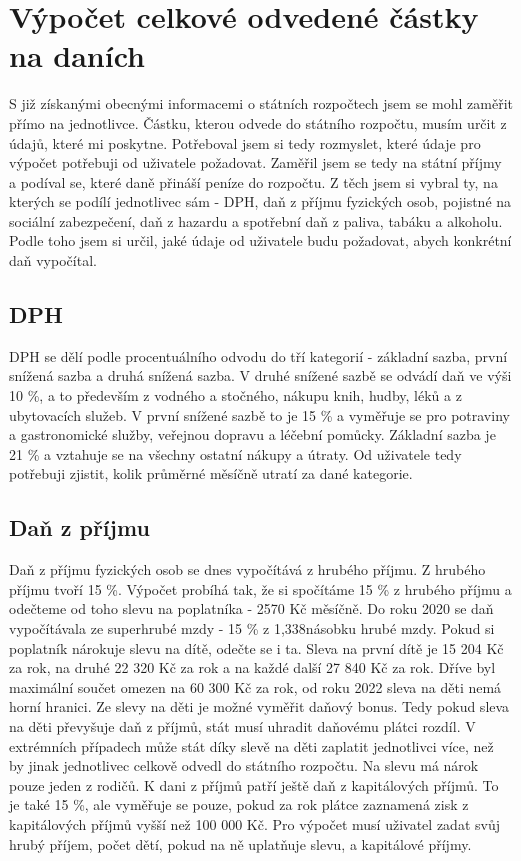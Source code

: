 \documentclass[11pt,a4paper,twoside,openright]{report}
\begin{document}
\section{Výpočet celkové odvedené částky na daních}

S již získanými obecnými informacemi o státních rozpočtech jsem se mohl zaměřit přímo na jednotlivce.
Částku, kterou odvede do státního rozpočtu, musím určit z údajů, které mi poskytne. Potřeboval jsem si tedy
 rozmyslet, které údaje pro výpočet potřebuji od uživatele požadovat. Zaměřil jsem se tedy na státní příjmy
a podíval se, které daně přináší peníze do rozpočtu. Z těch jsem si vybral ty, na kterých se podílí jednotlivec
sám - DPH, daň z příjmu fyzických osob, pojistné na sociální zabezpečení, daň z hazardu a spotřební daň z
paliva, tabáku a alkoholu. Podle toho jsem si určil, jaké údaje od uživatele budu požadovat, abych konkrétní
daň vypočítal.

\subsection{DPH}

DPH se dělí podle procentuálního odvodu do tří kategorií - základní sazba, první snížená
sazba a druhá snížená sazba. V druhé snížené sazbě se odvádí daň ve výši 10 \%, a to především
z vodného a stočného, nákupu knih, hudby, léků a z ubytovacích služeb. V první snížené sazbě to
je 15 \% a vyměřuje se pro potraviny a gastronomické služby, veřejnou dopravu a léčební pomůcky.
Základní sazba je 21 \% a vztahuje se na všechny ostatní nákupy a útraty. Od uživatele
tedy potřebuji zjistit, kolik průměrné měsíčně utratí za dané kategorie.

\subsection{Daň z příjmu}

Daň z příjmu fyzických osob se dnes vypočítává z hrubého příjmu. Z hrubého příjmu tvoří
15 \%. Výpočet probíhá tak, že si spočítáme 15 \% z hrubého příjmu a odečteme od toho
slevu na poplatníka - 2570 Kč měsíčně. Do roku 2020 se daň vypočítávala ze superhrubé mzdy
- 15 \% z 1,338násobku hrubé mzdy. Pokud si poplatník nárokuje slevu na dítě, odečte se i ta.
Sleva na první dítě je 15 204 Kč za rok, na druhé 22 320 Kč za rok a na každé další 27 840 Kč za rok. 
Dříve byl maximální součet omezen na 60 300 Kč za rok, od roku 2022 sleva na děti nemá horní
hranici. Ze slevy na děti je možné vyměřit daňový bonus. Tedy pokud sleva na děti převyšuje daň
z příjmů, stát musí uhradit daňovému plátci rozdíl. V extrémních případech může stát díky
slevě na děti zaplatit jednotlivci více, než by jinak jednotlivec celkově odvedl do státního
rozpočtu. Na slevu má nárok pouze jeden z rodičů. K dani z příjmů patří ještě daň z kapitálových
příjmů. To je také 15 \%, ale vyměřuje se pouze, pokud za rok plátce zaznamená zisk z kapitálových
příjmů vyšší než 100 000 Kč. Pro výpočet musí uživatel zadat svůj hrubý příjem, počet dětí,
pokud na ně uplatňuje slevu, a kapitálové příjmy.
\end{document}
